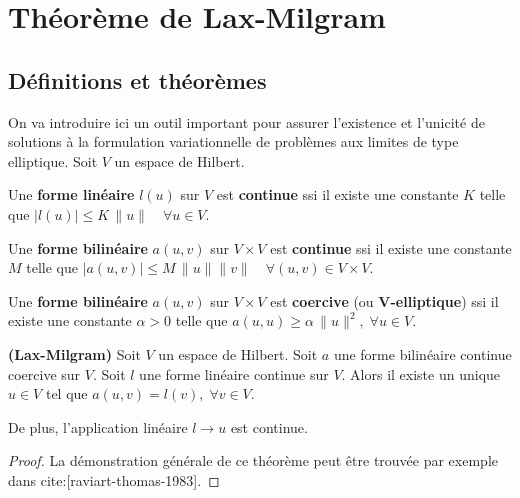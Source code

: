 \section{Théorème de Lax-Milgram}
\subsection{Définitions et théorèmes}
\label{sec:lax-milgram}
%
%
\noindent
On va introduire ici un outil important pour assurer l'existence et l'unicité de solutions \`a la formulation variationnelle de problèmes aux limites de type elliptique.\saut
%
Soit $V$ un espace de Hilbert.\\
%
\begin{definition}
  Une {\bf forme linéaire} $l(u)$ sur $V$ est {\bf continue} ssi il existe une
  constante $K$ telle que $|l(u)| \le K\, \|u\| \quad \forall u \in V$.\label{def:19}
\end{definition}

%
\begin{definition}
  Une {\bf forme bilinéaire} $a(u,v)$ sur $V\times V$ est {\bf continue} ssi
  il existe une constante $M$ telle que $|a(u,v)| \le M\, \|u\| \|v\| \quad
  \forall (u,v) \in V\times V$.\label{def:20}
\end{definition}

%
%
\begin{definition}
  Une {\bf forme bilinéaire} $a(u,v)$ sur $V\times V$ est {\bf coercive} (ou
  {\bf V-elliptique}) ssi il existe une constante $\alpha >0$ telle que
  $a(u,u) \ge \alpha \, \|u\|^2, \; \forall u \in V$.
  \label{def:21}
\end{definition}

%
%
\begin{theorem}
  \label{thr:12}
  {\bf (Lax-Milgram) } Soit $V$ un espace de Hilbert. Soit $a$ une forme
  bilinéaire continue coercive sur $V$. Soit $l$ une forme linéaire
  continue sur $V$. Alors il existe un unique $u\in V$ tel que $a(u,v)=l(v),\;
  \forall v\in V$.

  De plus, l'application linéaire $l \rightarrow u$ est continue.

  \begin{proof}
    La démonstration générale de ce théorème peut être trouvée par exemple dans cite:[raviart-thomas-1983].
  \end{proof}
\end{theorem}




